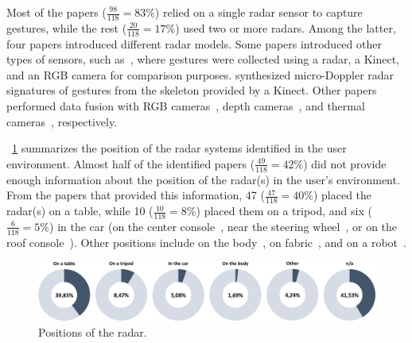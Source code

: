 Most of the papers ($\frac{98}{118}{=}83\%$) relied on a single radar sensor to capture gestures, while the rest ($\frac{20}{118}{=}17\%$) used two or more radars. Among the latter, four papers introduced different radar models. Some papers introduced other types of sensors, such as~\cite{Santhalingam:2020b}, where gestures were collected using a radar, a Kinect, and an RGB camera for comparison purposes. \cite{Gigie:2019} synthesized micro-Doppler radar signatures of gestures from the skeleton provided by a Kinect. Other papers performed data fusion with RGB cameras~\cite{Molchanov:2015,Vandersmissen:2020}, depth cameras~\cite{Tzadok:2020,Molchanov:2015}, and thermal cameras~\cite{Skaria:2020b}, respectively.

\fig~\ref{fig:state_of_the_art:radar:radar-position} summarizes the position of the radar systems identified in the user environment. Almost half of the identified papers ($\frac{49}{118} = 42\%$) did not provide enough information about the position of the radar(s) in the user's environment. From the papers that provided this information, 47 ($\frac{47}{118} = 40\%$) placed the radar(s) on a table, while 10 ($\frac{10}{118} = 8\%$) placed them on a tripod, and six ($\frac{6}{118} = 5\%$) in the car (\eg on the center console~\cite{Molchanov:2015}, near the steering wheel~\cite{Ahmed:2019, Sun:2018}, or on the roof console~\cite{Sun:2019}). Other positions include on the body~\cite{Miller:2020,Copic:2019}, on fabric~\cite{Wu:2020}, and on a robot~\cite{Li:2009}.

\begin{figure}[t]
    \centering
    \includegraphics[width=\linewidth]{Figures/StateOfTheArt/Radar/radar-positions.pdf}
    \caption{Positions of the radar.}
    \label{fig:state_of_the_art:radar:radar-position}
\end{figure}

